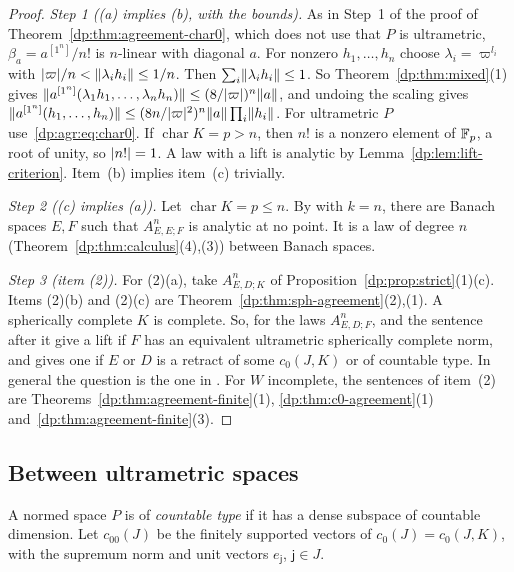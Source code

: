 \begin{proof}
\emph{Step 1 ((a) implies (b), with the bounds).} As in Step~1 of the proof of Theorem~\ref{dp:thm:agreement-char0}, which does not use that $P$ is ultrametric, $\beta_a=a^{[1^n]}/n!$ is $n$\nobreakdash-linear with diagonal $a$. For nonzero $h_1,\dots,h_n$ choose $\lambda_i=\varpi^{l_i}$ with $\lvert \varpi\rvert/n<\lVert \lambda_ih_i\rVert\le1/n$. Then $\sum_i\lVert \lambda_ih_i\rVert\le1$. So Theorem~\ref{dp:thm:mixed}(1) gives $\lVert a^{[1^n]}(\lambda_1h_1,\dots,\lambda_nh_n)\rVert\le(8/\lvert \varpi\rvert)^n\lVert a\rVert$, and undoing the scaling gives $\lVert a^{[1^n]}(h_1,\dots,h_n)\rVert\le(8n/\lvert \varpi\rvert^2)^n\lVert a\rVert\prod_i\lVert h_i\rVert$. For ultrametric $P$ use~\eqref{dp:agr:eq:char0}. If $\operatorname{char}K=p>n$, then $n!$ is a nonzero element of $\mathbb F_p$, a root of unity, so $\lvert n!\rvert=1$. A law with a lift is analytic by Lemma~\ref{dp:lem:lift-criterion}. Item~(b) implies item~(c) trivially.

\emph{Step 2 ((c) implies (a)).} Let $\operatorname{char}K=p\le n$. By \cite[Theorem~7.2(1)]{I} with $k=n$, there are Banach spaces $E,F$ such that $A^n_{E,E;F}$ is analytic at no point. It is a law of degree $n$ (Theorem~\ref{dp:thm:calculus}(4),(3)) between Banach spaces.

\emph{Step 3 (item (2)).} For (2)(a), take $A^n_{E,D;K}$ of Proposition~\ref{dp:prop:strict}(1)(c). Items (2)(b) and (2)(c) are Theorem~\ref{dp:thm:sph-agreement}(2),(1). A spherically complete $K$ is complete. So, for the laws $A^n_{E,D;F}$, \cite[Theorem~5.2]{I} and the sentence after it give a lift if $F$ has an equivalent ultrametric spherically complete norm, and \cite[Theorem~5.4]{I} gives one if $E$ or $D$ is a retract of some $c_0(J,K)$ or of countable type. In general the question is the one in \cite[Section~12]{I}. For $W$ incomplete, the sentences of item~(2) are Theorems~\ref{dp:thm:agreement-finite}(1), \ref{dp:thm:c0-agreement}(1) and~\ref{dp:thm:agreement-finite}(3).
\end{proof}

\subsection{Between ultrametric spaces}\label{dp:ssec:agree-ultrametric}

A normed space $P$ is of \emph{countable type} if it has a dense subspace of countable dimension. Let $c_{00}(J)$ be the finitely supported vectors of $c_0(J)=c_0(J,K)$, with the supremum norm and unit vectors $e_{\mathsf j}$, $\mathsf j\in J$.

